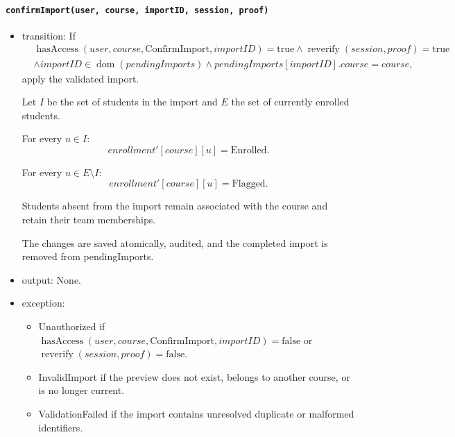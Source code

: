 \documentclass[12pt, titlepage]{article}
\begin{document}
\paragraph{\texttt{confirmImport(user, course, importID, session, proof)}}
\begin{itemize}
    \item transition: If
    \[
    \begin{aligned}
    &\operatorname{hasAccess}(user,course,\text{ConfirmImport},importID)=\text{true}
    \land \operatorname{reverify}(session,proof)=\text{true}\\
    &\land importID\in\operatorname{dom}(\mathit{pendingImports})
    \land \mathit{pendingImports}[importID].course=course,
    \end{aligned}
    \]
    apply the validated import.

    Let $I$ be the set of students in the import
    and $E$ the set of currently enrolled students.

    For every $u\in I$:
    \[
    \mathit{enrollment}'[course][u]
    =\text{Enrolled}.
    \]

    For every $u\in E\setminus I$:
    \[
    \mathit{enrollment}'[course][u]
    =\text{Flagged}.
    \]

    Students absent from the import remain associated with the course and retain their team memberships.

    The changes are saved atomically, audited, and the completed import is removed from pendingImports.

    \item output: None.

    \item exception:
    \begin{itemize}
        \item Unauthorized if $\operatorname{hasAccess}(user,course,\text{ConfirmImport},importID)=\text{false}$ or $\operatorname{reverify}(session,proof)=\text{false}$.
        \item InvalidImport if the preview does not exist, belongs to another course, or is no longer current.
        \item ValidationFailed if the import contains unresolved duplicate or malformed identifiers.
    \end{itemize}
\end{itemize}
\end{document}
